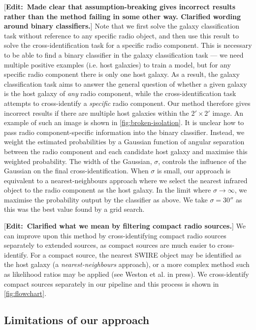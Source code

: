\documentclass[fleqn,usenatbib,usedcolumn]{mnras}
\newcommand{\edit}[1]{ {\color{red}[{\bf Edit:~{#1}}]} }
\begin{document}
    \edit{Made clear that assumption-breaking gives incorrect results rather than the method failing in some other way. Clarified wording around binary classifiers.} Note that we first solve the galaxy classification task without reference to any specific radio object, and then use this result to solve the cross-identification task for a specific radio component. This is necessary to be able to find a binary classifier in the galaxy classification task --- we need multiple positive examples (i.e. host galaxies) to train a model, but for any specific radio component there is only one host galaxy. As a result, the galaxy classification task aims to answer the general question of whether a given galaxy is the host galaxy of \emph{any} radio component, while the cross-identification task attempts to cross-identify a \emph{specific} radio component. Our method therefore gives incorrect results if there are multiple host galaxies within the $2' \times 2'$ image. An example of such an image is shown in \autoref{fig:broken-isolation}. It is unclear how to pass radio component-specific information into the binary classifier. Instead, we weight the estimated probabilities by a Gaussian function of angular separation between the radio component and each candidate host galaxy and maximise this weighted probability. The width of the Gaussian, $\sigma$, controls the influence of the Gaussian on the final cross-identification. When $\sigma$ is small, our approach is equivalent to a nearest-neighbours approach where we select the nearest infrared object to the radio component as the host galaxy. In the limit where $\sigma \to \infty$, we maximise the probability output by the classifier as above. We take $\sigma = 30''$ as this was the best value found by a grid search.

    \edit{Clarified what we mean by filtering compact radio sources.} We can improve upon this method by cross-identifying compact radio sources separately to extended sources, as compact sources are much easier to cross-identify. For a compact source, the nearest SWIRE object may be identified as the host galaxy (a \emph{nearest-neighbours} approach), or a more complex method such as likelihood ratios may be applied (see Weston et al. in press). We cross-identify compact sources separately in our pipeline and this process is shown in \autoref{fig:flowchart}.

  \subsection{Limitations of our approach}
    \label{sec:limitations}
\end{document}
